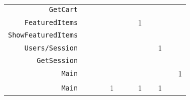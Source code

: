 \begin{apendicesenv}
\begin{landscape}
\begin{table}[!htb]
\begin{tabular}{r|C{1.2cm}C{1.2cm}C{1.2cm}C{1.2cm}C{1.2cm}C{1.2cm}C{1.2cm}C{1.2cm}C{1.2cm}C{1.2cm}C{1.2cm}}
            \texttt{GetCart}            &  &  &  &  &  &  &  &  &  &  &  \\
            \texttt{FeaturedItems}      &  &  &  &  &  &  & 1 &  &  &  &  \\
            \texttt{ShowFeaturedItems}  &  &  &  &  &  &  &  &  &  &  &  \\
            \texttt{Users/Session}      &  &  &  &  &  &  &  &  & 1 &  &  \\
            \texttt{GetSession}         &  &  &  &  &  &  &  &  &  &  &  \\
            \texttt{Main}               &  &  &  &  &  &  &  &  &  &  & 1 \\
            \texttt{Main}               &  &  &  & 1 &  &  & 1 &  & 1 &  &  \\
        \bottomrule
    \end{tabular}
\end{table}
\end{landscape}

\end{apendicesenv}
